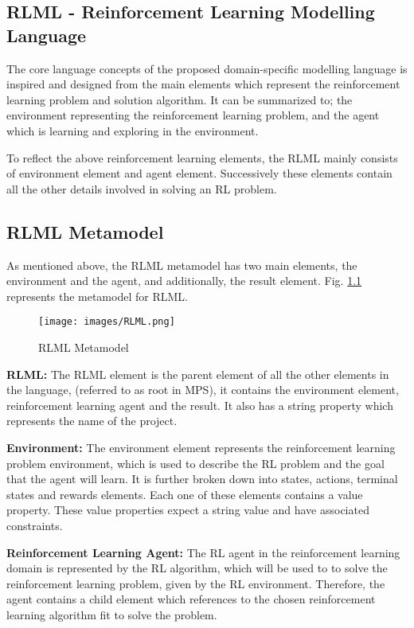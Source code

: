 \documentclass[11pt,letterpaper]{ryersonSGSThesis}
\begin{document}
\begin{ryersonSGSThesis}
\chapter{RLML - Reinforcement Learning Modelling Language}
\label{chap:RLML}
    The core language concepts of the proposed domain-specific modelling language is inspired and designed from the main elements which represent the reinforcement learning problem and solution algorithm. It can be summarized to; the environment representing the reinforcement learning problem, and the agent which is learning and exploring in the environment.
    
    To reflect the above reinforcement learning elements, the RLML mainly consists of environment element and agent element. Successively these elements contain all the other details involved in solving an RL problem.
        
    \section {RLML Metamodel}
        As mentioned above, the RLML metamodel has two main elements, the environment and the agent, and additionally, the result element. Fig. \ref{fig:RLMLMetamodel} represents the metamodel for RLML.
        
        \begin{figure}[!tbh]
            \centering
            \texttt{[image: images/RLML.png]}
            \caption{RLML Metamodel}
            \label{fig:RLMLMetamodel}
        \end{figure}
        
        \textbf{RLML:} The RLML element is the parent element of all the other elements in the language, (referred to as root in MPS), it contains the environment element, reinforcement learning agent and the result. It also has a string property which represents the name of the project.
        
        \textbf{Environment:} The environment element represents the reinforcement learning problem environment, which is used to describe the RL problem and the goal that the agent will learn. It is further broken down into states, actions, terminal states and rewards elements. Each one of these elements contains a value property. These value properties expect a string value and have associated constraints.
        
        \textbf{Reinforcement Learning Agent:} The RL agent in the reinforcement learning domain is represented by the RL algorithm, which will be used to to solve the reinforcement learning problem, given by the RL environment. Therefore, the agent contains a child element which references to the chosen reinforcement learning algorithm fit to solve the problem.
        

\end{ryersonSGSThesis}
\end{document}
